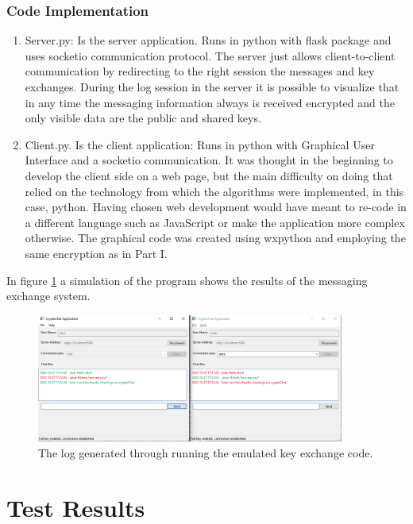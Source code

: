 \documentclass[letterpaper,12pt]{article}
\begin{document}
\subsubsection{Code Implementation}
\begin{enumerate}
    \item Server.py: Is the server application. Runs in python with flask package and uses socketio communication protocol. The server just allows client-to-client communication by redirecting to the right session the messages and key exchanges. During the log session in the server it is possible to visualize that in any time the messaging information always is received encrypted and the only visible data are the public and shared keys.
    \item Client.py. Is the client application: Runs in python with Graphical User Interface and a socketio communication. It was thought in the beginning to develop the client side on a web page, but the main difficulty on doing that relied on the technology from which the algorithms were implemented, in this case, python. Having chosen web development would have meant to re-code in a different language such as JavaScript or make the application more complex otherwise. The graphical code was created using wxpython and employing the same encryption as in Part I.
\end{enumerate}

In figure \ref{fig:CRP_CHAT} a simulation of the program shows the results of the messaging exchange system.

\begin{figure}[H]
    \centering
    \includegraphics[width=0.9\textwidth]{assets/cryptochat.png}
    \caption{The log generated through running the emulated key exchange code.}
    \label{fig:CRP_CHAT}
\end{figure}

\section{Test Results}
\end{document}
